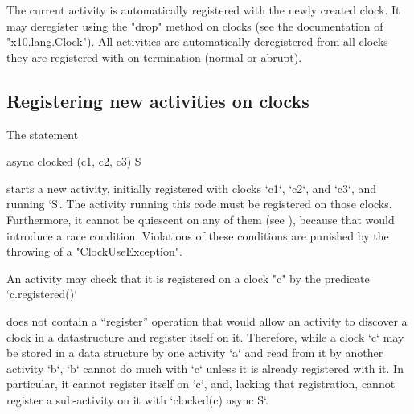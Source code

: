 
The current activity is automatically registered with the newly
created clock.  It may deregister using the \xcd"drop" method on
clocks (see the documentation of \xcd"x10.lang.Clock"). All activities
are automatically deregistered from all clocks they are registered
with on termination (normal or abrupt).

\subsection{Registering new activities on clocks}
\label{sec:clock:register}

The statement 

\begin{xten}
  async clocked (c1, c2, c3) S
\end{xten}
starts a new activity, initially registered with
clocks \xcd`c1`, \xcd`c2`, and \xcd`c3`, and  running \xcd`S`. The activity running this code must
be registered on those clocks. Furthermore, it cannot be quiescent on any of
them (see ), because that would introduce a race condition.
Violations of these conditions are punished by the throwing of a
\xcd"ClockUseException". 


An activity may check that it is registered on a clock \xcd"c" by
the predicate \xcd`c.registered()`


\begin{note}
\Xten{} does not contain a ``register'' operation that would allow an activity
to discover a clock in a datastructure and register itself on it. Therefore,
while a clock \xcd`c` may be stored in a data structure by one activity
\xcd`a` and read from it by another activity \xcd`b`, \xcd`b` cannot do much
with \xcd`c` unless it is already registered with it.  In particular, it
cannot register itself on \xcd`c`, and, lacking that registration, cannot
register a sub-activity on it with \xcd`clocked(c) async S`.
\end{note}

